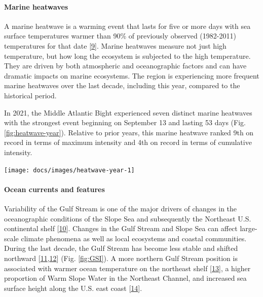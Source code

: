 \documentclass[
  10pt,
]{article}
\let\origfigure\figure
\let\endorigfigure\endfigure
\renewenvironment{figure}[1][2] {
    \expandafter\origfigure\expandafter[H]
} {
    \endorigfigure
}
\begin{document}
\hypertarget{marine-heatwaves}{%
\paragraph{Marine heatwaves}\label{marine-heatwaves}}

A marine heatwave is a warming event that lasts for five or more days
with sea surface temperatures warmer than 90\% of previously observed
(1982-2011) temperatures for that date
{[}\protect\hyperlink{ref-hobday_hierarchical_2016}{9}{]}. Marine
heatwaves measure not just high temperature, but how long the ecosystem
is subjected to the high temperature. They are driven by both
atmospheric and oceanographic factors and can have dramatic impacts on
marine ecosystems. The region is experiencing more frequent marine
heatwaves over the last decade, including this year, compared to the
historical period.

In 2021, the Middle Atlantic Bight experienced seven distinct marine
heatwaves with the strongest event beginning on September 13 and lasting
53 days (Fig. \ref{fig:heatwave-year}). Relative to prior years, this
marine heatwave ranked 9th on record in terms of maximum intensity and
4th on record in terms of cumulative intensity.

\begin{figure}

{\centering \texttt{[image: docs/images/heatwave-year-1]} 

}

\caption{Marine heatwave events (red) in the Mid-Atlantic occuring in 2020.}\label{fig:heatwave-year}
\end{figure}

\hypertarget{ocean-currents-and-features}{%
\paragraph{Ocean currents and
features}\label{ocean-currents-and-features}}

Variability of the Gulf Stream is one of the major drivers of changes in
the oceanographic conditions of the Slope Sea and subsequently the
Northeast U.S. continental shelf
{[}\protect\hyperlink{ref-gangopadhyay_census_2020}{10}{]}. Changes in
the Gulf Stream and Slope Sea can affect large-scale climate phenomena
as well as local ecosystems and coastal communities. During the last
decade, the Gulf Stream has become less stable and shifted northward
{[}\protect\hyperlink{ref-andres_recent_2016}{11},\protect\hyperlink{ref-caesar_observed_2018}{12}{]}
(Fig. \ref{fig:GSI}). A more northern Gulf Stream position is associated
with warmer ocean temperature on the northeast shelf
{[}\protect\hyperlink{ref-zhang_role_2007}{13}{]}, a higher proportion
of Warm Slope Water in the Northeast Channel, and increased sea surface
height along the U.S. east coast
{[}\protect\hyperlink{ref-goddard_extreme_2015}{14}{]}.
\end{document}
